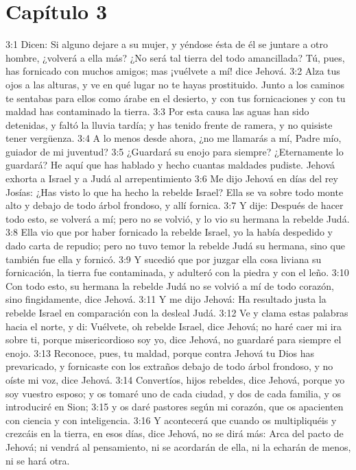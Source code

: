 \section*{Capítulo 3 }
 
3:1 Dicen: Si alguno dejare a su mujer, y yéndose ésta de él se juntare a otro hombre, ¿volverá a ella más? ¿No será tal tierra del todo amancillada? Tú, pues, has fornicado con muchos amigos; mas ¡vuélvete a mí! dice Jehová. 
3:2 Alza tus ojos a las alturas, y ve en qué lugar no te hayas prostituido. Junto a los caminos te sentabas para ellos como árabe en el desierto, y con tus fornicaciones y con tu maldad has contaminado la tierra. 
3:3 Por esta causa las aguas han sido detenidas, y faltó la lluvia tardía; y has tenido frente de ramera, y no quisiste tener vergüenza. 
3:4 A lo menos desde ahora, ¿no me llamarás a mí, Padre mío, guiador de mi juventud? 
3:5 ¿Guardará su enojo para siempre? ¿Eternamente lo guardará? He aquí que has hablado y hecho cuantas maldades pudiste. 
Jehová exhorta a Israel y a Judá al arrepentimiento 
3:6 Me dijo Jehová en días del rey Josías: ¿Has visto lo que ha hecho la rebelde Israel? Ella se va sobre todo monte alto y debajo de todo árbol frondoso, y allí fornica. 
3:7 Y dije: Después de hacer todo esto, se volverá a mí; pero no se volvió, y lo vio su hermana la rebelde Judá. 
3:8 Ella vio que por haber fornicado la rebelde Israel, yo la había despedido y dado carta de repudio; pero no tuvo temor la rebelde Judá su hermana, sino que también fue ella y fornicó. 
3:9 Y sucedió que por juzgar ella cosa liviana su fornicación, la tierra fue contaminada, y adulteró con la piedra y con el leño. 
3:10 Con todo esto, su hermana la rebelde Judá no se volvió a mí de todo corazón, sino fingidamente, dice Jehová. 
3:11 Y me dijo Jehová: Ha resultado justa la rebelde Israel en comparación con la desleal Judá. 
3:12 Ve y clama estas palabras hacia el norte, y di: Vuélvete, oh rebelde Israel, dice Jehová; no haré caer mi ira sobre ti, porque misericordioso soy yo, dice Jehová, no guardaré para siempre el enojo. 
3:13 Reconoce, pues, tu maldad, porque contra Jehová tu Dios has prevaricado, y fornicaste con los extraños debajo de todo árbol frondoso, y no oíste mi voz, dice Jehová. 
3:14 Convertíos, hijos rebeldes, dice Jehová, porque yo soy vuestro esposo; y os tomaré uno de cada ciudad, y dos de cada familia, y os introduciré en Sion; 
3:15 y os daré pastores según mi corazón, que os apacienten con ciencia y con inteligencia. 
3:16 Y acontecerá que cuando os multipliquéis y crezcáis en la tierra, en esos días, dice Jehová, no se dirá más: Arca del pacto de Jehová; ni vendrá al pensamiento, ni se acordarán de ella, ni la echarán de menos, ni se hará otra. 
